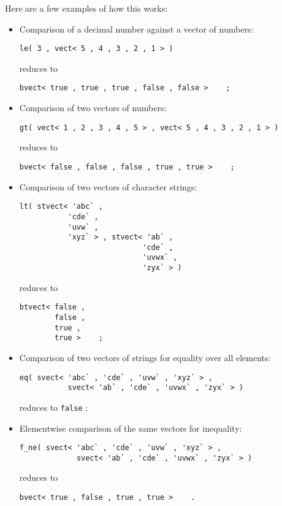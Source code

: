 Here are a few examples of how this works:
\begin{itemize}
\item Comparison of a decimal number against a vector of numbers:
\begin{verbatim}
le( 3 , vect< 5 , 4 , 3 , 2 , 1 > )
\end{verbatim}
reduces to
\begin{verbatim}
bvect< true , true , true , false , false >    ;
\end{verbatim}
\item Comparison of two vectors of numbers:
\begin{verbatim}
gt( vect< 1 , 2 , 3 , 4 , 5 > , vect< 5 , 4 , 3 , 2 , 1 > )
\end{verbatim}
reduces to
\begin{verbatim}
bvect< false , false , false , true , true >    ;
\end{verbatim}
\item Comparison of two vectors of character strings:
\begin{verbatim}
lt( stvect< 'abc` ,
           'cde` ,
           'uvw` ,
           'xyz` > , stvect< 'ab` ,
                            'cde` ,
                            'uvwx` ,
                            'zyx` > )
\end{verbatim}
reduces to
\begin{verbatim}
btvect< false ,
        false ,
        true ,
        true >    ;
\end{verbatim}
\item Comparison of two vectors of strings for equality
over all elements:
\begin{verbatim}
eq( svect< 'abc` , 'cde` , 'uvw` , 'xyz` > ,
           svect< 'ab` , 'cde` , 'uvwx` , 'zyx` > )
\end{verbatim}
reduces to {\tt false}    ;
\item Elementwise comparison of the same vectors
for inequality:
\begin{verbatim}
f_ne( svect< 'abc` , 'cde` , 'uvw` , 'xyz` > ,
             svect< 'ab` , 'cde` , 'uvwx` , 'zyx` > )
\end{verbatim}
reduces to
\begin{verbatim}
bvect< true , false , true , true >    .
\end{verbatim}
\end{itemize}

